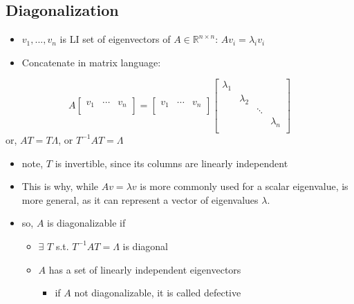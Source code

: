 \documentclass[10pt,letterpaper]{article}
\begin{document}
\subsection{Diagonalization}
\label{sec-11_2}

\begin{itemize}
\item $v_1,...,v_n$ is LI set of eigenvectors of $A \in \mathbb{R}^{n\times n}$: $Av_i=\lambda_i v_i$
\item Concatenate in matrix language:
\end{itemize}
$$
A
\begin{bmatrix}
  v_1 & \cdots & v_n \\
\end{bmatrix}
=
\begin{bmatrix}
  v_1 & \cdots & v_n \\
\end{bmatrix}
\begin{bmatrix}
  \lambda_1 &           &        &           \\
            & \lambda_2 &        &           \\
            &           & \ddots &           \\
            &           &        & \lambda_n \\
\end{bmatrix}
$$
or, $AT=T\Lambda$, or $T ^{-1} AT=\Lambda$
\begin{itemize}
\item note, $T$ is invertible, since its columns are linearly independent
\item This is why, while $Av=\lambda v$ is more commonly used for a scalar eigenvalue,  is more general, as it can represent a vector of eigenvalues $\lambda$.
\item so, $A$ is diagonalizable if

\begin{itemize}
\item $\exists$ $T$ s.t. $T ^{-1} AT=\Lambda$ is diagonal
\item $A$ has a set of linearly independent eigenvectors

\begin{itemize}
\item if $A$ not diagonalizable, it is called defective
\end{itemize}

\end{itemize}

\end{itemize}
\end{document}
